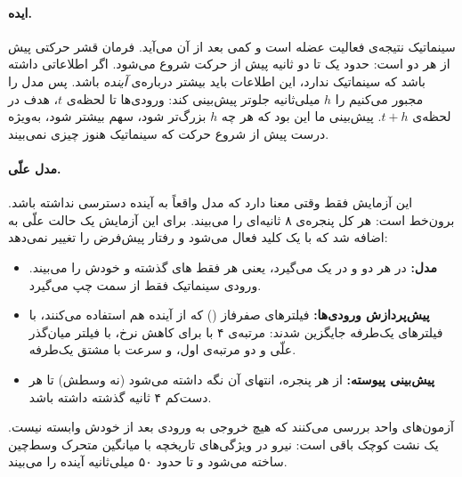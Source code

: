 \paragraph{ایده.} سینماتیک نتیجه‌ی فعالیت عضله است و کمی بعد از آن می‌آید. فرمان قشر حرکتی پیش از هر دو است:  حدود یک تا دو ثانیه پیش از حرکت شروع می‌شود. اگر  اطلاعاتی داشته باشد که سینماتیک ندارد، این اطلاعات باید بیشتر درباره‌ی \emph{آینده} باشد. پس مدل را مجبور می‌کنیم  را $h$ میلی‌ثانیه جلوتر پیش‌بینی کند: ورودی‌ها تا لحظه‌ی $t$، هدف در لحظه‌ی $t+h$. پیش‌بینی ما این بود که هر چه $h$ بزرگ‌تر شود، سهم  بیشتر شود، به‌ویژه درست پیش از شروع حرکت که سینماتیک هنوز چیزی نمی‌بیند.

\paragraph{مدل علّی.} این آزمایش فقط وقتی معنا دارد که مدل واقعاً به آینده دسترسی نداشته باشد.  برون‌خط است: هر  کل پنجره‌ی ۸ ثانیه‌ای را می‌بیند. برای این آزمایش یک حالت علّی به  اضافه شد که با یک کلید فعال می‌شود و رفتار پیش‌فرض را تغییر نمی‌دهد:
\begin{itemize}
\item \textbf{مدل:}  در هر دو  و در  یک  می‌گیرد، یعنی هر  فقط های گذشته و خودش را می‌بیند.  ورودی سینماتیک فقط از سمت چپ  می‌گیرد.
\item \textbf{پیش‌پردازش ورودی‌ها:} فیلترهای صفرفاز () که از آینده هم استفاده می‌کنند، با فیلترهای یک‌طرفه جایگزین شدند:  مرتبه‌ی ۴ با  برای کاهش نرخ،  با فیلتر میان‌گذر علّی و دو  مرتبه‌ی اول، و سرعت با مشتق  یک‌طرفه.
\item \textbf{پیش‌بینی پیوسته:} از هر پنجره، انتهای آن نگه داشته می‌شود (نه وسطش) تا هر  دست‌کم ۴ ثانیه گذشته داشته باشد.
\end{itemize}
آزمون‌های واحد بررسی می‌کنند که هیچ خروجی به ورودی بعد از خودش وابسته نیست. یک نشت کوچک باقی است:  نیرو در ویژگی‌های تاریخچه با میانگین متحرک وسط‌چین ساخته می‌شود و تا حدود ۵۰ میلی‌ثانیه آینده را می‌بیند.

